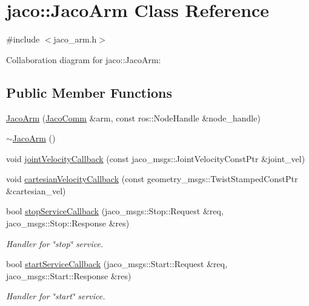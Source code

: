\hypertarget{classjaco_1_1_jaco_arm}{}\section{jaco\+:\+:Jaco\+Arm Class Reference}
\label{classjaco_1_1_jaco_arm}


{\ttfamily \#include $<$jaco\+\_\+arm.\+h$>$}



Collaboration diagram for jaco\+:\+:Jaco\+Arm\+:
\subsection*{Public Member Functions}
\begin{DoxyCompactItemize}
\item 
\hyperlink{classjaco_1_1_jaco_arm_ab29d25cb3b4bafdc523cbe271c801681}{Jaco\+Arm} (\hyperlink{classjaco_1_1_jaco_comm}{Jaco\+Comm} \&arm, const ros\+::\+Node\+Handle \&node\+\_\+handle)
\item 
\hyperlink{classjaco_1_1_jaco_arm_a77535c062ca1d8e11b11e691bb1ee0da}{$\sim$\+Jaco\+Arm} ()
\item 
void \hyperlink{classjaco_1_1_jaco_arm_a2c2cfc44e480845bbf7e78c6bfe454b6}{joint\+Velocity\+Callback} (const jaco\+\_\+msgs\+::\+Joint\+Velocity\+Const\+Ptr \&joint\+\_\+vel)
\item 
void \hyperlink{classjaco_1_1_jaco_arm_a091f2eaffef84362f69e3b49482982db}{cartesian\+Velocity\+Callback} (const geometry\+\_\+msgs\+::\+Twist\+Stamped\+Const\+Ptr \&cartesian\+\_\+vel)
\item 
bool \hyperlink{classjaco_1_1_jaco_arm_a14ddcea579804fbbd3fb11643bc91e78}{stop\+Service\+Callback} (jaco\+\_\+msgs\+::\+Stop\+::\+Request \&req, jaco\+\_\+msgs\+::\+Stop\+::\+Response \&res)
\begin{DoxyCompactList}\small\item\em Handler for \char`\"{}stop\char`\"{} service. \end{DoxyCompactList}\item 
bool \hyperlink{classjaco_1_1_jaco_arm_a0b59f245a5ca363c52dcbc211f20fa64}{start\+Service\+Callback} (jaco\+\_\+msgs\+::\+Start\+::\+Request \&req, jaco\+\_\+msgs\+::\+Start\+::\+Response \&res)
\begin{DoxyCompactList}\small\item\em Handler for \char`\"{}start\char`\"{} service. \end{DoxyCompactList}\item 

\end{DoxyCompactItemize}
